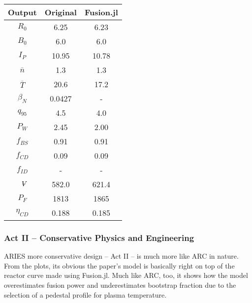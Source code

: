 \begin{table}[h!]
\begin{subtable}[t]{0.5\textwidth}
\begin{tabular}{ c|c|c }
Output           & Original         & Fusion.jl        \\
\hline
$R_{0}$          & 6.25             & 6.23           \\
$B_{0}$          & 6.0              & 6.0           \\
$I_{P}$          & 10.95            & 10.78           \\
$\overline n$    & 1.3              & 1.3           \\
$\overline T$    & 20.6             & 17.2            \\
$\beta_{N}$       & 0.0427           & -          \\
$q_{95}$         & 4.5              & 4.0           \\
$P_{W}$          & 2.45             & 2.00           \\
$f_{BS}$         & 0.91             & 0.91           \\
$f_{CD}$         & 0.09             & 0.09           \\
$f_{ID}$         & -              & -             \\
$\volume$         & 582.0            & 621.4           \\
$P_{F}$          & 1813           & 1865          \\
$\eta_{CD}$      & 0.188            & 0.185          \\

\end{tabular}
\end{subtable}
\hfill
\hfill
\end{table}

\newpage 

\subsubsection{Act II -- Conservative Physics and Engineering}

ARIES more conservative design -- Act II -- is much more like ARC in nature. From the plots, its obvious the paper's model is basically right on top of the reactor curve made using Fusion.jl.  Much like ARC, too, it shows how the model overestimates fusion power and underestimates bootstrap fraction due to the selection of a pedestal profile for plasma temperature.

